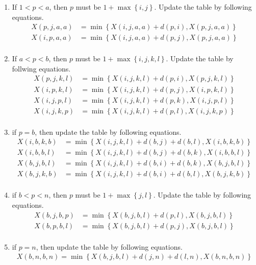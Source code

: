 \documentclass[12pt,letterpaper]{article}
\begin{document}
\begin{enumerate}
	\item If $1<p<a$, then $p$ must be $1+\max\left\{i,j\right\}$. Update the table by following equations.
		\begin{align*}
			X(p,j,a,a)&=\min\left\{X(i,j,a,a)+d(p,i), X(p,j,a,a)\right\}\\
			X(i,p,a,a)&=\min\left\{X(i,j,a,a)+d(p,j), X(p,j,a,a)\right\}\\
		\end{align*}
	\item If $a<p<b$, then $p$ must be $1+\max\left\{i,j,k,l\right\}$. Update the table by follwing equations.
		\begin{align*}
			X(p,j,k,l)&=\min\left\{X(i,j,k,l)+d(p,i), X(p,j,k,l)\right\}\\
			X(i,p,k,l)&=\min\left\{X(i,j,k,l)+d(p,j), X(i,p,k,l)\right\}\\
			X(i,j,p,l)&=\min\left\{X(i,j,k,l)+d(p,k), X(i,j,p,l)\right\}\\
			X(i,j,k,p)&=\min\left\{X(i,j,k,l)+d(p,l), X(i,j,k,p)\right\}\\
		\end{align*}
	\item if $p=b$, then update the table by following equations.
		\begin{align*}
			X(i,b,k,b)&=\min\left\{X(i,j,k,l)+d(b,j)+d(b,l),X(i,b,k,b)\right\}\\
			X(i,b,b,l)&=\min\left\{X(i,j,k,l)+d(b,j)+d(b,k),X(i,b,b,l)\right\}\\
			X(b,j,b,l)&=\min\left\{X(i,j,k,l)+d(b,i)+d(b,k),X(b,j,b,l)\right\}\\
			X(b,j,k,b)&=\min\left\{X(i,j,k,l)+d(b,i)+d(b,l),X(b,j,k,b)\right\}\\
		\end{align*}
	\item if $b<p<n$, then $p$ must be $1+\max\left\{j,l\right\}$. Update the table by following equations.
		\begin{align*}
			X(b,j,b,p)&=\min\left\{X(b,j,b,l)+d(p,l),X(b,j,b,l)\right\}\\
			X(b,p,b,l)&=\min\left\{X(b,j,b,l)+d(p,j),X(b,j,b,l)\right\}\\
		\end{align*}
	\item if $p=n$, then update the table by following equations.
		\begin{align*}
			X(b,n,b,n)=\min\left\{X(b,j,b,l)+d(j,n)+d(l,n), X(b,n,b,n)\right\}\\
		\end{align*}
\end{enumerate}
\end{document}
